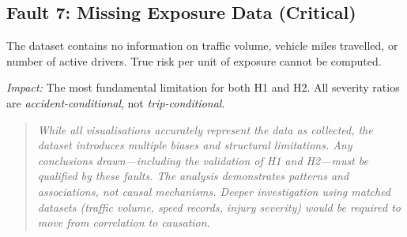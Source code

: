 \subsection{Fault 7: Missing Exposure Data (Critical)}
The dataset contains no information on traffic volume, vehicle miles travelled,
or number of active drivers. True risk per unit of exposure cannot be computed.

\textit{Impact:} The most fundamental limitation for both H1 and H2. All
severity ratios are \emph{accident-conditional}, not \emph{trip-conditional}.


\begin{quote}
  \itshape
  While all visualisations accurately represent the data as collected, the
  dataset introduces multiple biases and structural limitations. Any conclusions
  drawn---including the validation of H1 and H2---must be qualified by these
  faults. The analysis demonstrates patterns and associations, not causal
  mechanisms. Deeper investigation using matched datasets (traffic volume, speed
  records, injury severity) would be required to move from correlation to
  causation.
\end{quote}
